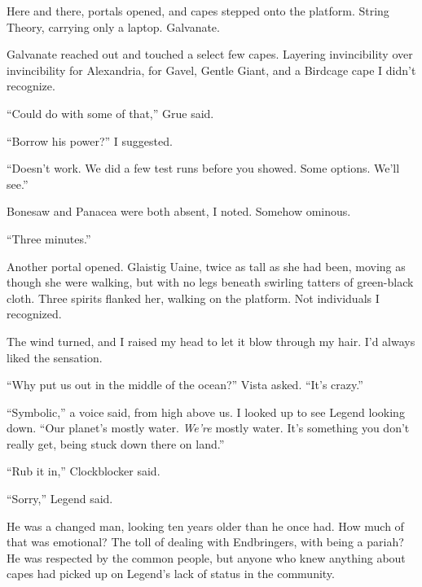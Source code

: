 Here and there, portals opened, and capes stepped onto the platform.  String Theory, carrying only a laptop.  Galvanate.



Galvanate reached out and touched a select few capes.  Layering invincibility over invincibility for Alexandria, for Gavel, Gentle Giant, and a Birdcage cape I didn't recognize.



``Could do with some of that,'' Grue said.



``Borrow his power?''  I suggested.



``Doesn't work.  We did a few test runs before you showed.  Some options.  We'll see.''



Bonesaw and Panacea were both absent, I noted.  Somehow ominous.



``Three minutes.''



Another portal opened.  Glaistig Uaine, twice as tall as she had been, moving as though she were walking, but with no legs beneath swirling tatters of green-black cloth.  Three spirits flanked her, walking on the platform.  Not individuals I recognized.



The wind turned, and I raised my head to let it blow through my hair.  I'd always liked the sensation.



``Why put us out in the middle of the ocean?'' Vista asked.  ``It's crazy.''



``Symbolic,'' a voice said, from high above us.  I looked up to see Legend looking down.  ``Our planet's mostly water.  \emph{We're} mostly water.  It's something you don't really get, being stuck down there on land.''



``Rub it in,'' Clockblocker said.



``Sorry,'' Legend said.



He was a changed man, looking ten years older than he once had.  How much of that was emotional?  The toll of dealing with Endbringers, with being a pariah?  He was respected by the common people, but anyone who knew anything about capes had picked up on Legend's lack of status in the community.



